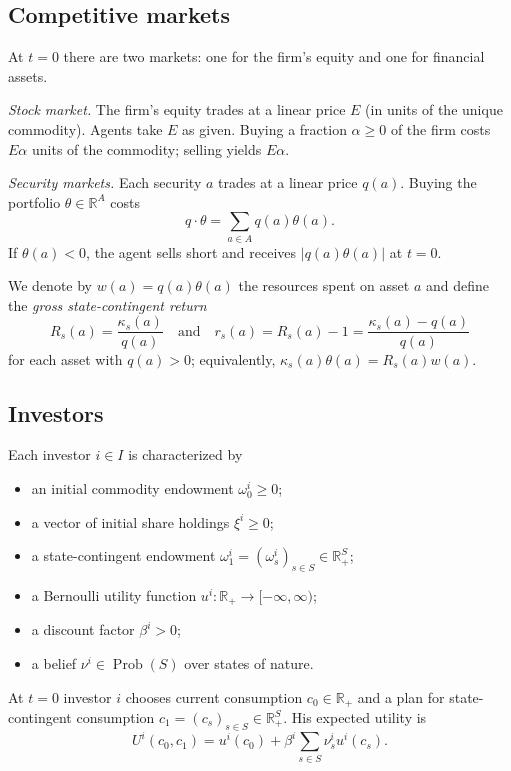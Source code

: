 \documentclass[11pt,a4paper,oneside]{book}
\def\R{\mathbb{R}}
\def\geq{\geqslant}
\def\et{\quad \text{and} \quad}
\DeclareMathOperator{\Prob}{Prob}
\theoremstyle{plain}
\theoremstyle{definition}
\theoremstyle{remark}
\numberwithin{equation}{chapter}
\begin{document}
\subsection{Competitive markets}

At $t=0$ there are two markets: one for the firm's equity and one for financial assets.

\emph{Stock market.}
The firm's equity trades at a linear price $E$ (in units of the unique commodity).
Agents take $E$ as given.
Buying a fraction $\alpha \geq 0$ of the firm costs $E \alpha$ units of the commodity; selling yields $E \alpha$.

\emph{Security markets.}
Each security $a$ trades at a linear price $q(a)$.
Buying the portfolio $\theta \in \R^A$ costs
\begin{equation*}
  q \cdot \theta = \sum_{a \in A} q(a) \theta(a).
\end{equation*}
If $\theta(a) < 0$, the agent sells short and receives $|q(a) \theta(a)|$ at $t=0$.

We denote by $w(a) = q(a) \theta(a)$ the resources spent on asset $a$ and define the \emph{gross state-contingent return}
\begin{equation*}
  R_s(a) = \frac{\kappa_s(a)}{q(a)}
  \et
  r_s(a) = R_s(a) - 1 = \frac{\kappa_s(a) - q(a)}{q(a)}
\end{equation*}
for each asset with $q(a) > 0$; equivalently, $\kappa_s(a) \theta(a) = R_s(a) w(a)$.

\subsection{Investors}

Each investor $i \in I$ is characterized by
\begin{itemize}
  \item an initial commodity endowment $\omega^i_0 \geq 0$;
  \item a vector of initial share holdings $\xi^i \geq 0$;
  \item a state-contingent endowment $\omega^i_1 = (\omega^i_s)_{s \in S} \in \R^{S}_{+}$;
  \item a Bernoulli utility function $u^i \colon \R_+ \to [-\infty, \infty)$;
  \item a discount factor $\beta^i > 0$;
  \item a belief $\nu^i \in \Prob(S)$ over states of nature.
\end{itemize}
At $t=0$ investor $i$ chooses current consumption $c_0 \in \R_+$ and a plan for state-contingent consumption $c_1 = (c_s)_{s \in S} \in \R_+^S$.
His expected utility is
\begin{equation}\label{eq:expected-utility}
  U^i(c_0, c_1) = u^i(c_0) + \beta^i \sum_{s \in S} \nu^i_s u^i(c_s).
\end{equation}
\end{document}
